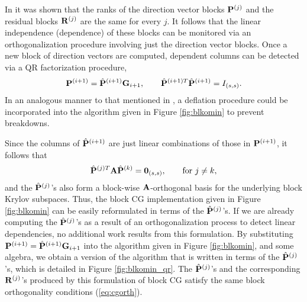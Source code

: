 \documentclass[twoside]{siamltex}
\newcommand{\bA}{{\bf A}}
\newcommand{\bG}{{\bf G}}
\newcommand{\bP}{{\bf P}}
\newcommand{\bR}{{\bf R}}
\newcommand{\dm}{\begin{displaymath}}
\newcommand{\edm}{\end{displaymath}}
\begin{document}
In \cite{Ol80} it was shown that the ranks of the direction vector
blocks $\bP^{(j)}$ and the residual blocks $\bR^{(j)}$ are the
same for every $j$. It follows that the linear independence
(dependence) of these blocks can be monitored via an
orthogonalization procedure involving just the direction vector
blocks. Once a new block of direction vectors are computed,
dependent columns can be detected via a QR factorization
procedure,
  \dm
  \bP^{(i+1)} = {\hat \bP}^{(i+1)} \bG_{i+1}, \qquad {\hat \bP}^{(i+1)T}{\hat
  \bP}^{(i+1)}= I_{(s,s)}.
  \edm
In an analogous manner to that mentioned in \cite{Ol80}, a
deflation procedure could be incorporated into the algorithm given
in Figure \ref{fig:blkomin} to prevent breakdowns.

Since the columns of ${\hat \bP}^{(i+1)}$ are just linear
combinations of those in $\bP^{(i+1)}$, it follows that
 \dm
  {\hat \bP}^{(j)T} \bA {\hat \bP}^{(k)} = {\bf 0}_{(s,s)}, \qquad {\rm for}~ j
  \ne k,
  \edm
and the ${\hat \bP}^{(j)}$'s also form a block-wise
$\bA$-orthogonal basis for the underlying block Krylov subspaces.
Thus, the block CG implementation given in Figure
\ref{fig:blkomin} can be easily reformulated in terms of the
${\hat \bP}^{(j)}$'s. If we are already computing the ${\hat
\bP}^{(j)}$'s as a result of an orthogonalization process to
detect linear dependencies, no additional work results from this
formulation. By substituting $\bP^{(i+1)} = {\hat \bP}^{(i+1)}
\bG_{i+1}$ into the algorithm given in Figure \ref{fig:blkomin},
and some algebra, we obtain a version of the algorithm that is
written in terms of the ${\hat \bP}^{(j)}$'s, which is detailed in
Figure \ref{fig:blkomin_qr}. The ${\hat \bP}^{(j)}$'s and the
corresponding $\bR^{(j)}$'s produced by this formulation of block
CG satisfy the same block orthogonality conditions
(\ref{eq:cgorth}).
\end{document}
